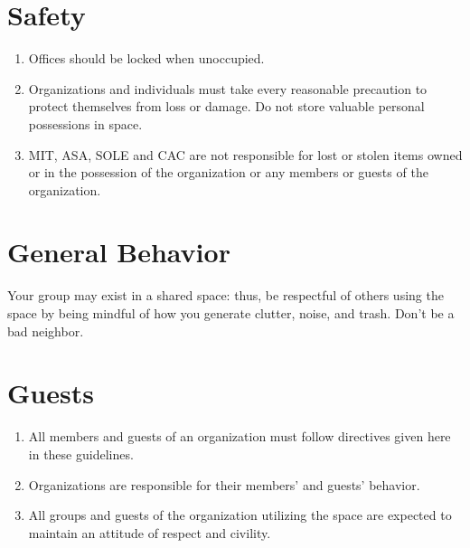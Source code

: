 \documentclass[12pt]{constitution}
\begin{document}
\section{Safety}
\begin{enumerate}
    \item Offices should be locked when unoccupied.
    
    \item Organizations and individuals must take every reasonable precaution to protect themselves from
        loss or damage.
    Do not store valuable personal possessions in space.

    \item MIT, ASA, SOLE and CAC are not responsible for lost or stolen items owned or in the possession
        of the organization or any members or guests of the organization.
\end{enumerate}

\section{General Behavior}
Your group may exist in a shared space: thus, be respectful of others using the space by being mindful
    of how you generate clutter, noise, and trash.
Don't be a bad neighbor. 

\section{Guests}
\begin{enumerate}
    \item  All members and guests of an organization must follow directives given here in these guidelines.

    \item Organizations are responsible for their members' and guests' behavior.
    
    \item All groups and guests of the organization utilizing the space are expected to maintain an
        attitude of respect and civility.
\end{enumerate}
\end{document}
